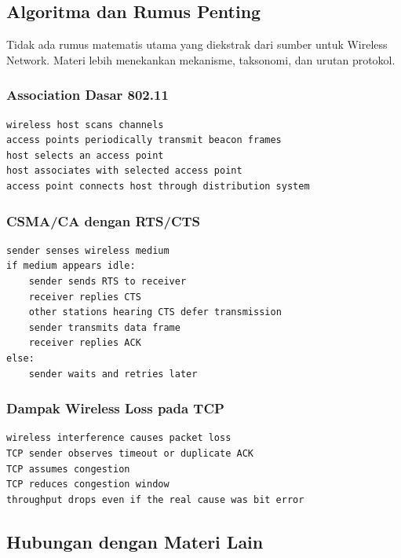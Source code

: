\subsection{Algoritma dan Rumus Penting}

Tidak ada rumus matematis utama yang diekstrak dari sumber untuk Wireless Network. Materi lebih menekankan mekanisme, taksonomi, dan urutan protokol.

\subsubsection*{Association Dasar 802.11}

\begin{lstlisting}[language={},caption={Association host ke access point}]
wireless host scans channels
access points periodically transmit beacon frames
host selects an access point
host associates with selected access point
access point connects host through distribution system
\end{lstlisting}

\subsubsection*{CSMA/CA dengan RTS/CTS}

\begin{lstlisting}[language={},caption={Urutan CSMA/CA dengan RTS/CTS}]
sender senses wireless medium
if medium appears idle:
    sender sends RTS to receiver
    receiver replies CTS
    other stations hearing CTS defer transmission
    sender transmits data frame
    receiver replies ACK
else:
    sender waits and retries later
\end{lstlisting}

\subsubsection*{Dampak Wireless Loss pada TCP}

\begin{lstlisting}[language={},caption={Kesalahan interpretasi TCP pada wireless}]
wireless interference causes packet loss
TCP sender observes timeout or duplicate ACK
TCP assumes congestion
TCP reduces congestion window
throughput drops even if the real cause was bit error
\end{lstlisting}

\subsection{Hubungan dengan Materi Lain}

